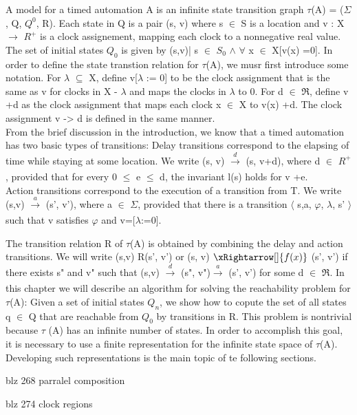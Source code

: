 A model for a timed automation A is an infinite state transition graph $\tau$(A) = ($\Sigma$, Q, $Q^{0}$, R). Each state in Q is a pair (s, v) where s $\in$ S is a location and v : X $\rightarrow$  $R^{+}$ is a clock assignement, mapping each clock to a nonnegative real value. The set of initial states $Q_0$ is given by {(s,v)| s $\in$ $S_0$ $\wedge$ $\forall$ x  $\in$  X[v(x) =0]}.
In order to define the state transtion relation for $\tau$(A), we musr first introduce some notation. For $\lambda$ $\subseteq$ X, define v[$\lambda$ := 0] to be the clock assignment that is the same as v for clocks in X - $\lambda$ and maps the clocks in $\lambda$ to 0. For d $\in$ $\Re$, define v +d as the clock assignment that maps each clock x $\in$ X to v(x) +d. The clock assignment v -> d is defined in the same  manner. \\
From the brief discussion in the introduction, we know that a timed automation has two basic types of transitions:
Delay transitions correspond to the elapsing of time while staying at some location. We write (s, v) $\xrightarrow[]{d}$ (s, v+d), where d $\in$  $R^{+}$, provided that for every 0 $\leq$ e $\leq$ d, the invariant	l(s) holds for v +e. \\
Action transitions correspond to the execution of a transition	 from T. We write (s,v) $\xrightarrow[]{a}$ (s', v'), where a $\in$ $\Sigma$, provided that there is a transition $\langle$ s,a, $\varphi$, $\lambda$, s' $\rangle$ such that v satisfies $\varphi$ and v=[$\lambda$:=0].

The transition relation R of $\tau$(A) is obtained by combining the delay and action transitions. We will write (s,v) R(s', v') or (s, v) $\xRightarrow[]{f(x)}$   (s', v') if there exists s" and v" such that (s,v) $\xrightarrow[]{d}$ (s", v")$\xrightarrow[]{a}$ (s', v') for some d $\in$ $\Re$.
In this chapter we will describe an algorithm for solving the reachability problem for $\tau$(A): Given a set of initial states $Q_n$, we show how to copute the set of all states q $\in$ Q that are reachable from $Q_0$ by transitions in R. This problem is nontrivial because $\tau$ (A) has an infinite number of states. In order to accomplish this goal, it is necessary to use a finite representation for the infinite state space of $\tau$(A). Developing such representations is the main topic of te following sections.

blz 268 parralel composition

blz 274 clock regions
